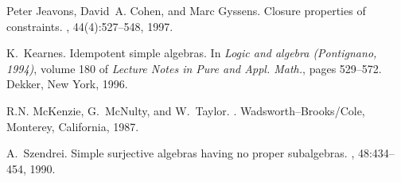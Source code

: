 \documentclass[11pt]{article}
\begin{document}
\begin{thebibliography}{10}
Peter Jeavons, David~A. Cohen, and Marc Gyssens.
\newblock Closure properties of constraints.
, 44(4):527--548, 1997.

K.~Kearnes.
\newblock Idempotent simple algebras.
\newblock In {\em Logic and algebra (Pontignano, 1994)}, volume 180 of {\em
  Lecture Notes in Pure and Appl. Math.}, pages 529--572. Dekker, New York,
  1996.

R.N. McKenzie, G.~McNulty, and W.~Taylor.
.
\newblock Wadsworth--Brooks/Cole, Monterey, California, 1987.

A.~Szendrei.
\newblock Simple surjective algebras having no proper subalgebras.
,
  48:434--454, 1990.

\end{thebibliography}
\end{document}
